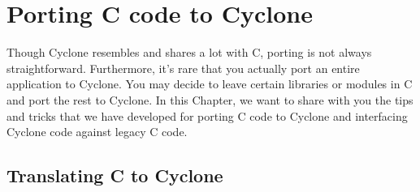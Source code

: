 \section{Porting C code to Cyclone}

\ifscreen
\newenvironment{porta}[2]{%
  \begin{list}{}{}%
  \item[\hypertarget{#1}{\colorbox{lightblue}{\textbf{#2}}}]}{\end{list}}
\else
\newenvironment{porta}[2]{%
  \begin{list}{}{}%
  \item[\hypertarget{#1}{\textbf{#2}}]}{\end{list}}
\fi

Though Cyclone resembles and shares a lot with C, porting is not
always straightforward.  Furthermore, it's rare that you actually port
an entire application to Cyclone.  You may decide to leave certain
libraries or modules in C and port the rest to Cyclone.  In this
Chapter, we want to share with you the tips and tricks that we have
developed for porting C code to Cyclone and interfacing Cyclone
code against legacy C code.

\subsection{Translating C to Cyclone}

